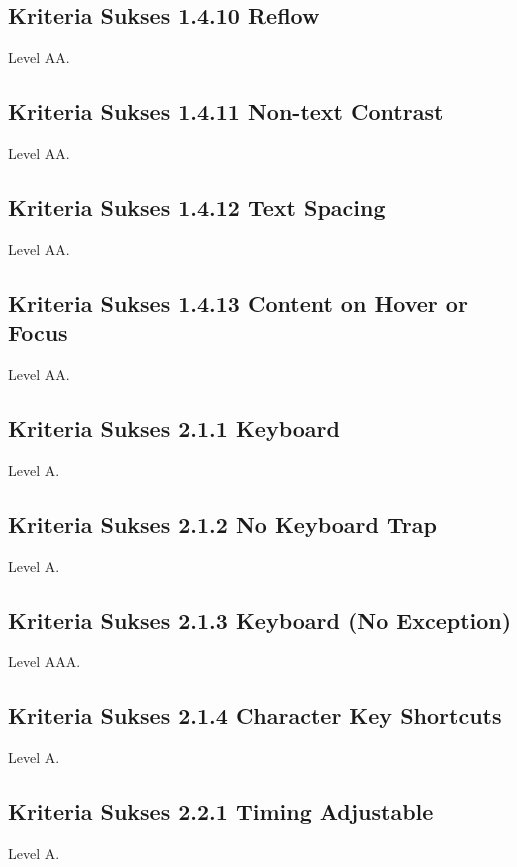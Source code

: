 \subsection{Kriteria Sukses 1.4.10 Reflow}
\label{sec:kriteria_1.4.10}
Level AA.

\subsection{Kriteria Sukses 1.4.11 Non-text Contrast}
\label{sec:kriteria_1.4.11}
Level AA.

\subsection{Kriteria Sukses 1.4.12 Text Spacing}
\label{sec:kriteria_1.4.12}
Level AA.

\subsection{Kriteria Sukses 1.4.13 Content on Hover or Focus}
\label{sec:kriteria_1.4.13}
Level AA.

\subsection{Kriteria Sukses 2.1.1 Keyboard}
\label{sec:kriteria_2.1.1}
Level A.

\subsection{Kriteria Sukses 2.1.2 No Keyboard Trap}
\label{sec:kriteria_2.1.2}
Level A.

\subsection{Kriteria Sukses 2.1.3 Keyboard (No Exception)}
\label{sec:kriteria_2.1.3}
Level AAA.

\subsection{Kriteria Sukses 2.1.4 Character Key Shortcuts}
\label{sec:kriteria_2.1.4}
Level A.

\subsection{Kriteria Sukses 2.2.1 Timing Adjustable}
\label{sec:kriteria_2.2.1}
Level A.

